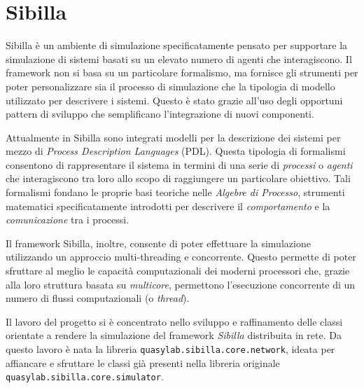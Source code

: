 \section*{Sibilla}
Sibilla \`e un ambiente di simulazione specificatamente pensato per supportare la simulazione di sistemi basati su un elevato numero di agenti che interagiscono.
%
Il framework non si basa su un particolare formalismo, ma fornisce gli strumenti per poter personalizzare sia il processo di simulazione che la tipologia di modello utilizzato per descrivere i sistemi.
%
Questo \`e stato grazie all'uso degli opportuni pattern di sviluppo che semplificano l'integrazione di nuovi componenti.

Attualmente in Sibilla sono integrati modelli per la descrizione dei sistemi per mezzo di \emph{Process Description Languages} (PDL). Questa tipologia di formalismi consentono di rappresentare il sistema in termini di una serie di \emph{processi} o \emph{agenti} che interagiscono tra loro allo scopo di raggiungere un particolare obiettivo.
%
Tali formalismi fondano le proprie basi teoriche nelle \emph{Algebre di Processo}, strumenti matematici specificatamente introdotti per descrivere il \emph{comportamento} e la \emph{comunicazione} tra i processi.

Il framework Sibilla, inoltre, consente di poter effettuare la simulazione utilizzando un approccio multi-threading e concorrente. 
%
Questo permette di poter sfruttare al meglio le capacit\`a computazionali dei moderni processori che, grazie alla loro struttura basata su \emph{multicore}, permettono l'esecuzione concorrente di un numero di flussi computazionali (o \emph{thread}).

Il lavoro del progetto si è concentrato nello sviluppo e raffinamento delle classi orientate a rendere la simulazione del framework \emph{Sibilla} distribuita in rete.
%
Da questo lavoro è nata la libreria \texttt{quasylab.sibilla.core.network}, ideata per affiancare e sfruttare le classi già presenti nella libreria originale \texttt{quasylab.sibilla.core.simulator}.